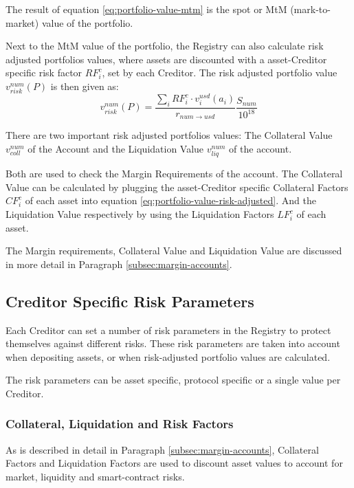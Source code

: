 \documentclass[sigconf,nonacm]{acmart}
\begin{document}
The result of equation \ref{eq:portfolio-value-mtm} is the spot or MtM (mark-to-market) value of the portfolio.

Next to the MtM value of the portfolio, the Registry can also calculate risk adjusted portfolios values,
where assets are discounted with a asset-Creditor specific risk factor $RF_{i}^{c}$, set by each Creditor.
The risk adjusted portfolio value $v_{risk}^{num}(P)$ is then given as:
\begin{equation}
    \label{eq:portfolio-value-risk-adjusted}
    v_{risk}^{num}(P) = \frac{\sum_{i}{RF_{i}^{c} \cdot v^{usd}_{i}(a_{i})}}{r_{num\rightarrow usd}}\frac{S_{num}}{10^{18}}
\end{equation}

There are two important risk adjusted portfolios values: The Collateral Value $v_{coll}^{num}$ of the Account and the Liquidation Value $v_{liq}^{num}$ of the account.

Both are used to check the Margin Requirements of the account.
The Collateral Value can be calculated by plugging the asset-Creditor specific Collateral Factors $CF_{i}^{c}$ of each asset into equation \ref{eq:portfolio-value-risk-adjusted}.
And the Liquidation Value respectively by using the Liquidation Factors $LF_{i}^{c}$ of each asset.

The Margin requirements, Collateral Value and Liquidation Value are discussed in more detail in Paragraph \ref{subsec:margin-accounts}.

\subsection{Creditor Specific Risk Parameters}
\label{subsec:creditor-specific-cisk-parameters}
Each Creditor can set a number of risk parameters in the Registry to protect themselves against different risks.
These risk parameters are taken into account when depositing assets, or when risk-adjusted portfolio values are calculated.

The risk parameters can be asset specific, protocol specific or a single value per Creditor.

\subsubsection{Collateral, Liquidation and Risk Factors}
As is described in detail in Paragraph \ref{subsec:margin-accounts}, Collateral Factors and Liquidation Factors are used to discount asset values to account for market, liquidity and smart-contract risks.
\end{document}
